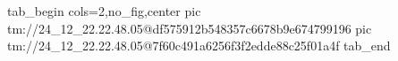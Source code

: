 
 
 
 
 

\qqSecOrig


\ifcmt
  tab_begin cols=2,no_fig,center
    pic tm://24_12_22.22.48.05@df575912b548357c6678b9e674799196
    pic tm://24_12_22.22.48.05@7f60c491a6256f3f2edde88c25f01a4f
  tab_end
\fi

